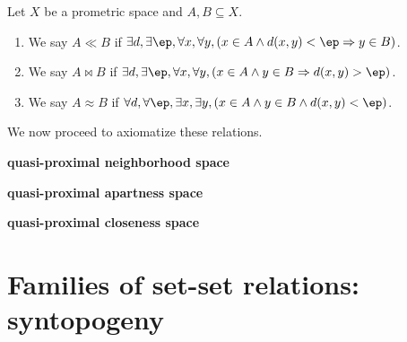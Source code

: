 \documentclass{article}
\def\Rp{[0,\infty]}
\let\implies\Rightarrow
\begin{document}
\begin{defn}
  Let $X$ be a prometric space and $A,B\subseteq X$.
  \begin{enumerate}
  \item We say $A\ll B$ if $\exists d, \exists \ep, \forall x, \forall y, (x\in A \land d(x,y)<\ep \implies y\in B)$.
  \item We say $A\bowtie B$ if $\exists d, \exists \ep, \forall x, \forall y, (x\in A \land y\in B \implies d(x,y)>\ep)$.
  \item We say $A\approx B$ if $\forall d, \forall \ep, \exists x, \exists y, (x\in A \land y\in B \land d(x,y)<\ep)$.
  \end{enumerate}
\end{defn}

We now proceed to axiomatize these relations.

\begin{defn}
  \textbf{quasi-proximal neighborhood space}
\end{defn}

\begin{defn}
  \textbf{quasi-proximal apartness space}
\end{defn}

\begin{defn}
  \textbf{quasi-proximal closeness space}
\end{defn}


\section{Families of set-set relations: syntopogeny}
\label{sec:syntopogeny}









\end{document}
